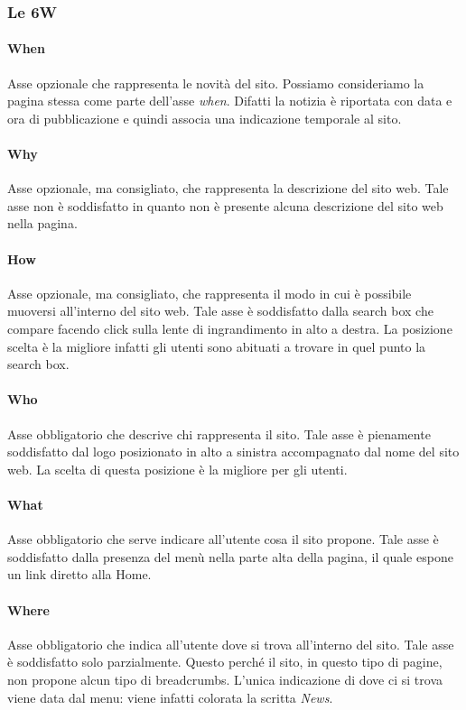 \documentclass[../ProgettoTecWeb2.tex]{subfiles}
\begin{document}
		\subsubsection{Le 6W}
			\paragraph{When}
			Asse opzionale che rappresenta le novità del sito. Possiamo consideriamo la pagina stessa come parte dell'asse \textit{when}. Difatti la notizia è riportata con data e ora di pubblicazione e quindi associa una indicazione temporale al sito.

			\paragraph{Why}
			Asse opzionale, ma consigliato, che rappresenta la descrizione del sito web. Tale asse non è soddisfatto in quanto non è presente alcuna descrizione del sito web nella pagina.

			\paragraph{How}
			Asse opzionale, ma consigliato, che rappresenta il modo in cui è possibile muoversi all'interno del sito web. Tale asse è soddisfatto dalla search box che compare facendo click sulla lente di ingrandimento in alto a destra. La posizione scelta è la migliore infatti gli utenti sono abituati a trovare in quel punto la search box. 
			
			\paragraph{Who}
			Asse obbligatorio che descrive chi rappresenta il sito. Tale asse è pienamente soddisfatto dal logo posizionato in alto a sinistra accompagnato dal nome del sito web. La scelta di questa posizione è la migliore per gli utenti.

			\paragraph{What}
			Asse obbligatorio che serve indicare all'utente cosa il sito propone. Tale asse è soddisfatto dalla presenza del menù nella parte alta della pagina, il quale espone un link diretto alla Home.

			\paragraph{Where}
			Asse obbligatorio che indica all'utente dove si trova all'interno del sito. Tale asse è soddisfatto solo parzialmente. Questo perché il sito, in questo tipo di pagine, non propone alcun tipo di breadcrumbs. L'unica indicazione di dove ci si trova viene data dal menu: viene infatti colorata la scritta \textit{News}.
\end{document}
